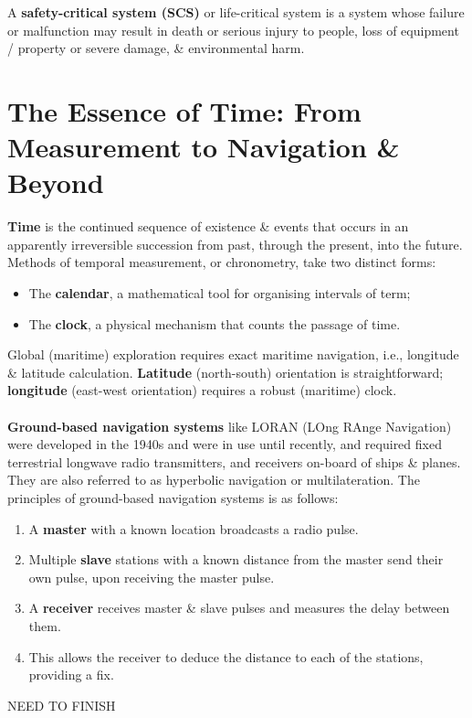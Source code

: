 \documentclass[a4paper,11pt]{article}
\begin{document}
A \textbf{safety-critical system (SCS)} or life-critical system is a system whose failure or malfunction may result in death or serious injury to people, loss of equipment / property or severe damage, \& environmental harm.

\section{The Essence of Time: From Measurement to Navigation \& Beyond}
\textbf{Time} is the continued sequence of existence \& events that occurs in an apparently irreversible succession from past, through the present, into the future.
Methods of temporal measurement, or chronometry, take two distinct forms:
\begin{itemize}
    \item   The \textbf{calendar}, a mathematical tool for organising intervals of term;
    \item   The \textbf{clock}, a physical mechanism that counts the passage of time.
\end{itemize}

Global (maritime) exploration requires exact maritime navigation, i.e., longitude \& latitude calculation.
\textbf{Latitude} (north-south) orientation is straightforward; \textbf{longitude} (east-west orientation) requires a robust (maritime) clock.
\\\\
\textbf{Ground-based navigation systems} like LORAN (LOng RAnge Navigation) were developed in the 1940s and were in use until recently, and required fixed terrestrial longwave radio transmitters, and receivers on-board of ships \& planes.
They are also referred to as hyperbolic navigation or multilateration.
The principles of ground-based navigation systems is as follows:
\begin{enumerate}
    \item   A \textbf{master} with a known location broadcasts a radio pulse.
    \item   Multiple \textbf{slave} stations with a known distance from the master send their own pulse, upon receiving the master pulse.
    \item   A \textbf{receiver} receives master \& slave pulses and measures the delay between them.
    \item   This allows the receiver to deduce the distance to each of the stations, providing a fix.
\end{enumerate}

NEED TO FINISH
\end{document}
